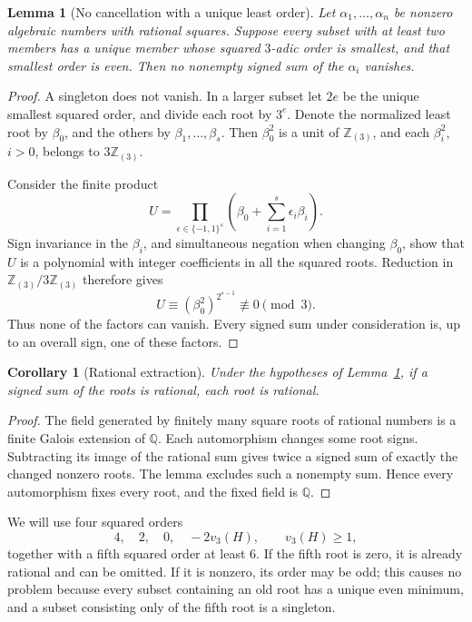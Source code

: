 \documentclass[11pt]{article}
\newtheorem{lemma}[theorem]{Lemma}
\newtheorem{corollary}[theorem]{Corollary}
\theoremstyle{definition}
\theoremstyle{remark}
\newcommand{\Z}{\mathbb Z}
\newcommand{\Q}{\mathbb Q}
\newcommand{\vp}{v_3}
\begin{document}
\begin{lemma}[No cancellation with a unique least order]\label{lem:nocancel}
Let \(\alpha_1,\ldots,\alpha_n\) be nonzero algebraic numbers with
rational squares. Suppose every subset with at least two members has
a unique member whose squared \(3\)-adic order is smallest, and that
smallest order is even. Then no nonempty signed sum of the
\(\alpha_i\) vanishes.
\end{lemma}
\begin{proof}
A singleton does not vanish. In a larger subset let \(2e\) be the unique
smallest squared order, and divide each root by \(3^e\). Denote the
normalized least root by \(\beta_0\), and the others by
\(\beta_1,\ldots,\beta_s\). Then \(\beta_0^2\) is a unit of
\(\Z_{(3)}\), and each \(\beta_i^2\), \(i>0\), belongs to
\(3\Z_{(3)}\).

Consider the finite product
\[
 U=\prod_{\epsilon\in\{-1,1\}^s}
       \left(\beta_0+\sum_{i=1}^s\epsilon_i\beta_i\right).
\]
Sign invariance in the \(\beta_i\), and simultaneous negation when
changing \(\beta_0\), show that \(U\) is a polynomial with integer
coefficients in all the squared roots. Reduction in \(\Z_{(3)}/3\Z_{(3)}\)
therefore gives
\[
 U\equiv(\beta_0^2)^{2^{s-1}}\not\equiv0\pmod3.
\]
Thus none of the factors can vanish. Every signed sum under consideration
is, up to an overall sign, one of these factors.
\end{proof}

\begin{corollary}[Rational extraction]\label{cor:extract}
Under the hypotheses of Lemma~\ref{lem:nocancel}, if a signed sum of the
roots is rational, each root is rational.
\end{corollary}
\begin{proof}
The field generated by finitely many square roots of rational numbers
is a finite Galois extension of \(\Q\). Each automorphism changes some
root signs. Subtracting its image of the rational sum gives twice a signed
sum of exactly the changed nonzero roots. The lemma excludes such a
nonempty sum. Hence every automorphism fixes every root, and the fixed
field is \(\Q\).
\end{proof}

We will use four squared orders
\begin{equation}
 4,\quad2,\quad0,\quad-2\vp(H),\qquad \vp(H)\ge1,
 \label{eq:orders}
\end{equation}
together with a fifth squared order at least \(6\).
If the fifth root is zero, it is already rational and can be omitted.
If it is nonzero, its order may be odd; this causes no problem because
every subset containing an old root has a unique even minimum, and a
subset consisting only of the fifth root is a singleton.
\end{document}
